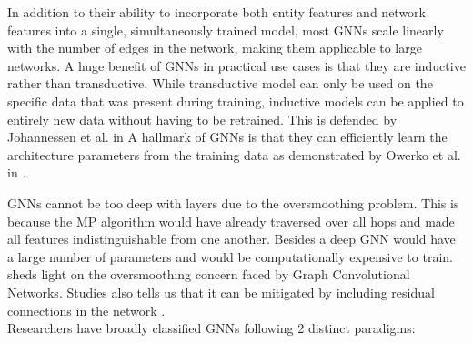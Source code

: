 \documentclass{report} %
\begin{document}
In addition to their ability to incorporate both entity features and network features into a single, simultaneously trained model, most \ac{GNN}s scale linearly with 
the number of edges in the network, making them applicable to large networks. A huge benefit of \ac{GNN}s in practical use cases is that they are inductive rather 
than transductive. While transductive model can only be used on the specific data that was present during training, inductive models can be applied to entirely new 
data without having to be retrained. This is defended by Johannessen et al. in \cite{ML HGNN-2023}
A hallmark of \ac{GNN}s is that they can efficiently learn the architecture parameters from the training data as demonstrated by Owerko et al. in \cite{PO GNN-2018}.

\ac{GNN}s cannot be too deep with layers due to the oversmoothing problem. 
This is because the \ac{MP} algorithm would have already traversed over all hops and made all features indistinguishable from one another.
Besides a deep \ac{GNN} would have a large number of parameters and would be computationally expensive to train.
\cite{GCN-2018} sheds light on the oversmoothing concern faced by Graph Convolutional Networks.
Studies also tells us that it can be mitigated by including residual connections in the network \cite{RHGNN-2022}.\\

Researchers have broadly classified \ac{GNN}s following 2 distinct paradigms:
\end{document}
